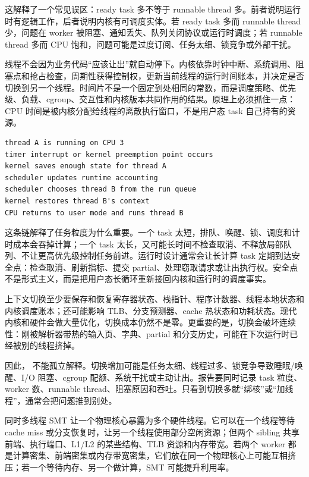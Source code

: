 这解释了一个常见误区：ready task 多不等于 runnable thread 多。前者说明运行时有逻辑工作，后者说明内核有可调度实体。若 ready task 多而 runnable thread 少，问题在 worker 被阻塞、通知丢失、队列关闭协议或运行时调度；若 runnable thread 多而 CPU 饱和，问题可能是过度订阅、任务太细、锁竞争或外部干扰。

线程不会因为业务代码“应该让出”就自动停下。内核依靠时钟中断、系统调用、阻塞点和抢占检查，周期性获得控制权，更新当前线程的运行时间账本，并决定是否切换到另一个线程。时间片不是一个固定到处相同的常数，而是调度策略、优先级、负载、cgroup、交互性和内核版本共同作用的结果。原理上必须抓住一点：CPU 时间是被内核分配给线程的离散执行窗口，不是用户态 task 自己持有的资源。

\begin{lstlisting}[numbers=none,caption={一次抢占式调度的粗事件链}]
thread A is running on CPU 3
timer interrupt or kernel preemption point occurs
kernel saves enough state for thread A
scheduler updates runtime accounting
scheduler chooses thread B from the run queue
kernel restores thread B's context
CPU returns to user mode and runs thread B
\end{lstlisting}

这条链解释了任务粒度为什么重要。一个 task 太短，排队、唤醒、锁、调度和计时成本会吞掉计算；一个 task 太长，又可能长时间不检查取消、不释放局部队列、不让更高优先级控制任务前进。运行时设计通常会让长计算 task 定期到达安全点：检查取消、刷新指标、提交 partial、处理窃取请求或让出执行权。安全点不是形式主义，而是把用户态长循环重新接回内核和运行时的调度事实。

上下文切换至少要保存和恢复寄存器状态、栈指针、程序计数器、线程本地状态和内核调度账本；还可能影响 TLB、分支预测器、cache 热状态和功耗状态。现代内核和硬件会做大量优化，切换成本仍然不是零。更重要的是，切换会破坏连续性：刚被解析器带热的输入页、字典、partial 和分支历史，可能在下次运行时已经被别的线程挤掉。

因此， 不能孤立解释。切换增加可能是任务太细、线程过多、锁竞争导致睡眠/唤醒、I/O 阻塞、cgroup 配额、系统干扰或主动让出。报告要同时记录 task 粒度、worker 数、runnable thread、阻塞原因和吞吐。只看到切换多就“绑核”或“加线程”，通常会把问题推到别处。

同时多线程 SMT 让一个物理核心暴露为多个硬件线程。它可以在一个线程等待 cache miss 或分支恢复时，让另一个线程使用部分空闲资源；但两个 sibling 共享前端、执行端口、L1/L2 的某些结构、TLB 资源和内存带宽。若两个 worker 都是计算密集、前端密集或内存带宽密集，它们放在同一个物理核心上可能互相挤压；若一个等待内存、另一个做计算，SMT 可能提升利用率。

